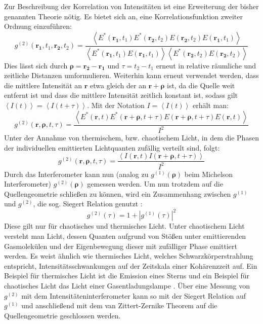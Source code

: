 Zur Beschreibung der Korrelation von Intensitäten ist eine Erweiterung der bisher genannten Theorie nötig. 
Es bietet sich an, eine Korrelationsfunktion zweiter Ordnung einzuführen:
\begin{equation}
    g^{(2)}(\mathbf{r_1}, t_1, \mathbf{r_2}, t_2) = \frac{\left<E^*(\mathbf{r_1}, t_1)E^*(\mathbf{r_2}, t_2)E(\mathbf{r_2}, t_2)E(\mathbf{r_1}, t_1)\right>}{\left<E^*(\mathbf{r_1}, t_1)E(\mathbf{r_1}, t_1)\right> \left<E^*(\mathbf{r_2}, t_2)E(\mathbf{r_2}, t_2)\right> }
\end{equation}
Dies lässt sich durch $\bm{\rho} = \mathbf{r_2} - \mathbf{r_1}$ und $\tau = t_2 - t_1$ erneut in relative räumliche und zeitliche Distanzen umformulieren. Weiterhin kann erneut verwendet werden, dass die mittlere Intensität an $\mathbf{r}$ etwa gleich der an $\mathbf{r} +\bm{\rho}$ ist, da die  Quelle weit entfernt ist und dass die mittlere Intensität zeitlich konstant ist, sodass gilt $\left<I(t)\right> = \left<I(t+\tau)\right>$. Mit der Notation $I=\left<I(t)\right>$ erhält man:
\begin{equation}
    g^{(2)}(\mathbf{r}, \bm{\rho}, t, \tau) = \frac{\left<E^*(\mathbf{r}, t)E^*(\mathbf{r+\rho}, t+\tau)E(\mathbf{r+\rho}, t+\tau)E(\mathbf{r}, t)\right>}{I^2}
\end{equation}
Unter der Annahme von thermischem, bzw. chaotischem Licht, in dem die Phasen der individuellen emittierten Lichtquanten zufällig verteilt sind, folgt:
\begin{equation}
    g^{(2)}(\mathbf{r}, \bm{\rho}, t, \tau) =  \frac{\left<I(\mathbf{r}, t) I(\mathbf{r}+\bm{\rho}, t+\tau)\right>}{I^2}
\end{equation}
Durch das Interferometer kann nun (analog zu $g^{(1)}(\bm{\rho})$ beim Michelson Interferometer) $g^{(2)}(\bm{\rho})$ gemessen werden. 
Um nun trotzdem auf die Quellengeometrie schließen zu können, wird ein Zusammenhang zwischen $g^{(1)}$ und $g^{(2)}$, die sog. Siegert Relation genutzt \cite{lasseguesFieldIntensityCorrelations2022}:
\begin{equation}
    g^{(2)}(\tau) = 1+ \left|g^{(1)}(\tau)\right|^2
\end{equation}
Diese gilt nur für chaotisches und thermisches Licht. 
Unter chaotischem Licht versteht man Licht, dessen Quanten aufgrund von Stößen unter emittierenden Gasmolekülen und der Eigenbewegung dieser mit zufälliger Phase emittiert werden. 
Es weist ähnlich wie thermisches Licht, welches Schwarzkörperstrahlung entspricht, Intensitätsschwankungen auf der  Zeitskala einer Kohärenzzeit auf. 
Ein Beispiel für thermisches Licht ist die Emission eines Sterns und ein Beispiel für chaotisches Licht das Licht einer Gasentladungslampe \cite{foxQuantumOpticsIntroduction2006}. 
Über eine Messung von $g^{(2)}$ mit dem Intensitäteninterferometer kann so mit der Siegert Relation auf $g^{(1)}$ und anschließend mit dem van Zittert-Zernike Theorem auf die Quellengeometrie geschlossen werden. \\

